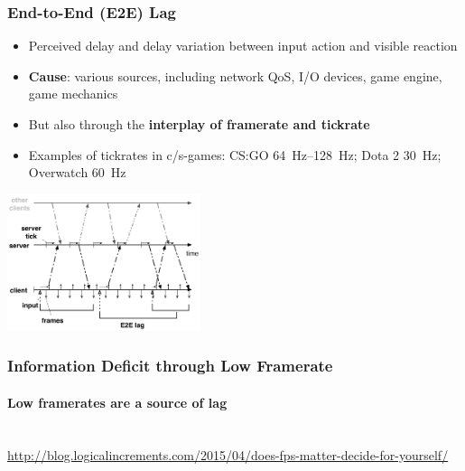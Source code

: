 \documentclass{UDEbeamerEN}
\begin{document}
\begin{frame}
	\frametitle{End-to-End (E2E) Lag}

	\begin{itemize}
		\item Perceived delay and delay variation between input action and visible reaction
		\item \textbf{Cause}: various sources, including network QoS, I/O devices, game engine, game mechanics
		\item But also through the \textbf{interplay of framerate and tickrate}
		\item Examples of tickrates in c/s-games: CS:GO \SIrange{64}{128}{\hertz}; Dota 2 \SI{30}{\hertz}; Overwatch \SI{60}{\hertz}
	\end{itemize}

	\pause
	\vspace{-3mm}
	\begin{center}
		\includegraphics[height=4cm]{../../../models/tickrate-timeseries-poster.pdf}
	\end{center}

\end{frame}


\begin{frame}
	\frametitle{Information Deficit through Low Framerate}
	\framesubtitle{Low framerates are a source of lag}

	\begin{center}
		\\
		{\tiny\url{http://blog.logicalincrements.com/2015/04/does-fps-matter-decide-for-yourself/}}
	\end{center}
\end{frame}
\end{document}
